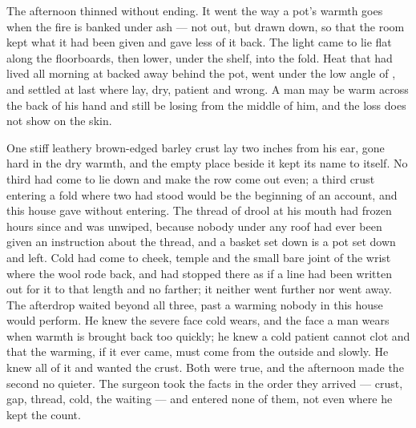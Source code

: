 The afternoon thinned without ending. It went the way a pot's warmth goes when the fire is banked under ash --- not out, but drawn down, so that the room kept what it had been given and gave less of it back. The light came to lie flat along the floorboards, then lower, under the shelf, into the fold. Heat that had lived all morning at  backed away behind the pot, went under the low angle of , and settled at last where  lay, dry, patient and wrong. A man may be warm across the back of his hand and still be losing from the middle of him, and the loss does not show on the skin.

One stiff leathery brown-edged barley crust lay two inches from his ear, gone hard in the dry warmth, and the empty place beside it kept its name to itself. No third had come to lie down and make the row come out even; a third crust entering a fold where two had stood would be the beginning of an account, and this house gave without entering. The thread of drool at his mouth had frozen hours since and was unwiped, because nobody under any roof had ever been given an instruction about the thread, and a basket set down is a pot set down and left. Cold had come to cheek, temple and the small bare joint of the wrist where the wool rode back, and had stopped there as if a line had been written out for it to that length and no farther; it neither went further nor went away. The afterdrop waited beyond all three, past a warming nobody in this house would perform. He knew the severe face cold wears, and the face a man wears when warmth is brought back too quickly; he knew a cold patient cannot clot and that the warming, if it ever came, must come from the outside and slowly. He knew all of it and wanted the crust. Both were true, and the afternoon made the second no quieter. The surgeon took the facts in the order they arrived --- crust, gap, thread, cold, the waiting --- and entered none of them, not even where he kept the count.


